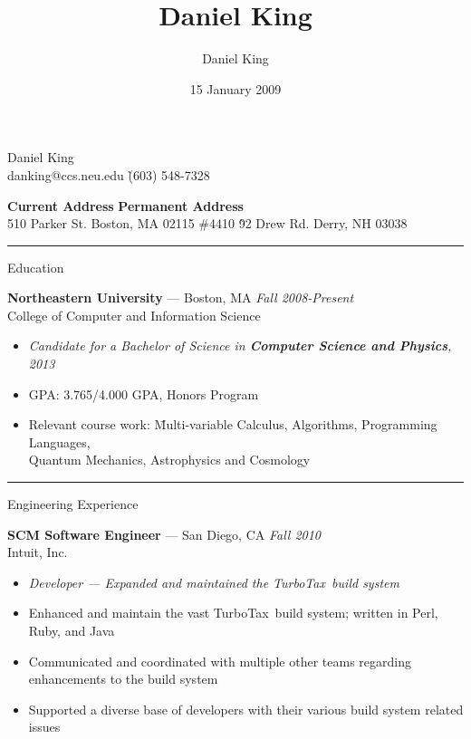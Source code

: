 \documentclass[10pt]{letter}
\author{Daniel King}
\title{Daniel King}
\date{15 January 2009}
\begin{document}
\begin{tabbing}{\Huge Daniel King} \\
\normalsize danking@ccs.neu.edu \`(603) 548-7328
\end{tabbing}

\vspace{-10pt}
\begin{tabbing}
\textbf{Current Address} \`\textbf{Permanent Address}\\
510 Parker St. Boston, MA 02115 \#4410 \`92 Drew Rd. Derry, NH 03038
\end{tabbing}\vspace{-15pt}
\rule{\linewidth}{.5pt}

{\Large Education}
\begin{tabbing}
{\large \bf Northeastern University} --- Boston, MA \` \textit{Fall 2008-Present} \\
College of Computer and Information Science
\end{tabbing}\vspace{-10pt}

\begin{itemize}
\setlength\itemsep{1pt}
\item[] \textit{Candidate for a Bachelor of Science in \textbf{Computer Science and Physics}, 2013}
\item GPA: 3.765/4.000 GPA, Honors Program
\item \begin{tabbing}Relevant course work:\hspace{.3in}
  \=Multi-variable Calculus, Algorithms, Programming Languages, \\
  \>Quantum Mechanics, Astrophysics and Cosmology\end{tabbing}
\end{itemize}

\rule{\linewidth}{.5pt}

{\Large Engineering Experience}
\begin{tabbing}
{\large \bf SCM Software Engineer} --- San Diego, CA \` \textit{Fall 2010} \\
Intuit, Inc.

\end{tabbing}\vspace{-10pt}

\begin{itemize}
\setlength\itemsep{1pt}
\item [] \textit{Developer --- Expanded and maintained the TurboTax\textsuperscript{\textregistered}~build system}
\item Enhanced and maintain the vast TurboTax\textsuperscript{\textregistered}~build system; written in Perl, Ruby, and Java
\item Communicated and coordinated with multiple other teams regarding enhancements to the build system
\item Supported a diverse base of developers with their various build system related issues
\end{itemize}
\end{document}
